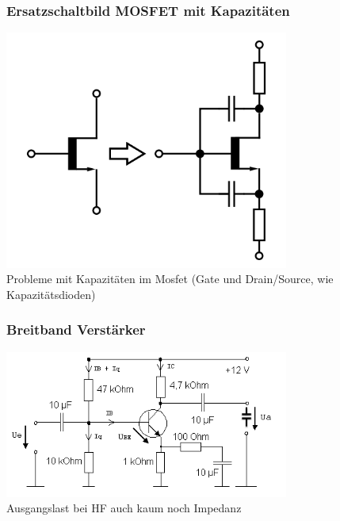 \begin{frame}
    \frametitle{Ersatzschaltbild MOSFET mit Kapazitäten}
    \begin{center}
        \includegraphics[width=0.7\textwidth,height=.6\textheight,keepaspectratio]{a07/HF_Ersatzschaltbild.png}
	{\tiny \hyperlink{refs}{\cite{wm}}} \\[2em]
	Probleme mit Kapazitäten im Mosfet (Gate und Drain/Source, wie Kapazitätsdioden)
     \end{center}
\end{frame}

\begin{frame}
    \frametitle{Breitband Verstärker}
    \begin{center}
        \includegraphics[width=0.7\textwidth]{a07/Breitbandverstarker.png}
	{\tiny \hyperlink{refs}{\cite{wm}}} \\[3em]
        Ausgangslast bei HF auch kaum noch Impedanz
     \end{center}
\end{frame}

